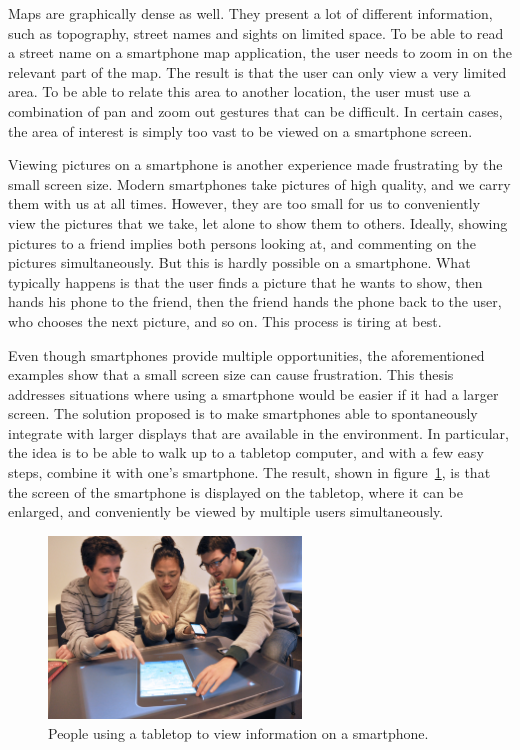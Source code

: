 Maps are graphically dense as well.
They present a lot of different information, such as topography, street names and sights on limited space.
To be able to read a street name on a smartphone map application, the user needs to zoom in on the relevant part of the map.
The result is that the user can only view a very limited area.
To be able to relate this area to another location, the user must use a combination of pan and zoom out gestures that can be difficult.
In certain cases, the area of interest is simply too vast to be viewed on a smartphone screen.

Viewing pictures on a smartphone is another experience made frustrating by the small screen size.
Modern smartphones take pictures of high quality, and we carry them with us at all times.
However, they are too small for us to conveniently view the pictures that we take, let alone to show them to others.
Ideally, showing pictures to a friend implies both persons looking at, and commenting on the pictures simultaneously.
But this is hardly possible on a smartphone.
What typically happens is that the user finds a picture that he wants to show, then hands his phone to the friend, then the friend hands the phone back to the user, who chooses the next picture, and so on.
This process is tiring at best.

Even though smartphones provide multiple opportunities, the aforementioned examples show that a small screen size can cause frustration.
This thesis addresses situations where using a smartphone would be easier if it had a larger screen.
The solution proposed is to make smartphones able to spontaneously integrate with larger displays that are available in the environment.
In particular, the idea is to be able to walk up to a tabletop computer, and with a few easy steps, combine it with one's smartphone.
The result, shown in figure~\ref{fig:tide}, is that the screen of the smartphone is displayed on the tabletop, where it can be enlarged, and conveniently be viewed by multiple users simultaneously.

\begin{figure}[htb]
  \centering
    \includegraphics[width=0.6\textwidth]{images/tide456}
  \caption{People using a tabletop to view information on a smartphone.}
  \label{fig:tide}
\end{figure}

